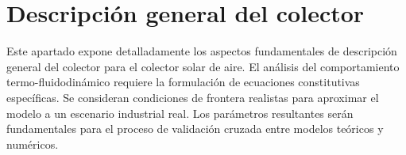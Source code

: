\section{Descripción general del colector}
\label{sec:cap05_descripcion}

Este apartado expone detalladamente los aspectos fundamentales de descripción general del colector para el colector solar de aire.
El análisis del comportamiento termo-fluidodinámico requiere la formulación de ecuaciones constitutivas específicas.
Se consideran condiciones de frontera realistas para aproximar el modelo a un escenario industrial real.
Los parámetros resultantes serán fundamentales para el proceso de validación cruzada entre modelos teóricos y numéricos.
